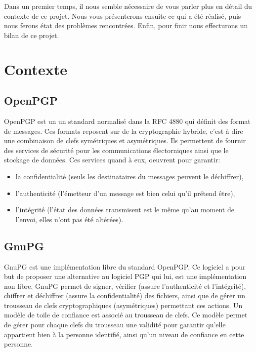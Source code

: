 \documentclass{../res/univ-projet}
\begin{document}
Dans un premier temps, il nous semble nécessaire de vous parler plus en 
détail du contexte de ce projet. Nous vous présenterons ensuite ce qui a été 
réalisé, puis nous ferons état des problèmes rencontrées. Enfin, pour finir 
nous effecturons un bilan de ce projet.

\section{Contexte}
  \subsection{OpenPGP}
    OpenPGP est un un standard normalisé dans la RFC 4880 qui définit des 
    format de messages. Ces formats reposent sur de la cryptographie hybride, 
    c'est à dire une combinaison de clefs symétriques et asymétriques. Ils 
    permettent de fournir des services de sécurité pour les communications 
    électorniques ainsi que le stockage de données. Ces services quand à eux,
    oeuvrent pour garantir:
    \begin{itemize}
     \item la confidentialité (seuls les destinataires du messages 
	   peuvent le déchiffrer),
     \item l'authenticité (l'émetteur d'un message est bien celui qu'il 
	   prétend être),
     \item l'intégrité (l'état des données transmisent est le même qu'au 
	   moment de l'envoi, elles n'ont pas été altérées).
    \end{itemize}
 
  \subsection{GnuPG}
    GnuPG est une implémentation libre du standard OpenPGP. Ce logiciel a 
    pour but de proposer une alternative au logiciel PGP qui lui, est une
    implémentation non libre. 
    GnuPG permet de signer, vérifier (assure l'authenticité et l'intégrité), 
    chiffrer et déchiffrer (assure la confidentialité) des fichiers, ainsi 
    que de gérer un trousseau de clefs cryptographiques (asymétriques) 
    permettant ces actions. 
    Un modèle de toile de confiance est associé au trousseau de clefs. 
    Ce modèle permet de gérer pour chaque clefs du trousseau une 
    validité pour garantir qu'elle appartient bien à la personne 
    identifié, ainsi qu'un niveau de confiance en cette personne.
    
\end{document}
